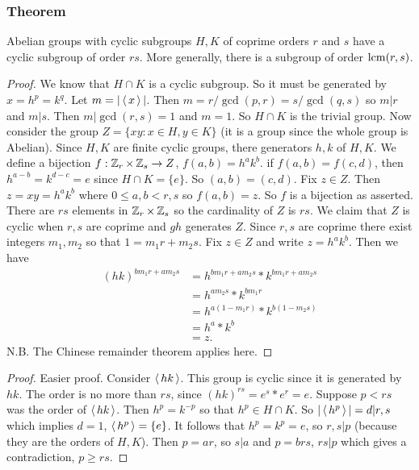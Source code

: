 \subsubsection*{Theorem}
Abelian groups with cyclic subgroups $H,K$ of coprime orders $r$ and $s$
have a cyclic subgroup of order $rs$. More generally, there is a subgroup of order $\operatorname{lcm}(r,s)$.
\begin{proof}
We know that $H \cap K$ is a cyclic subgroup. So it must be generated by $x = h^p  = k^q$.
Let $m = |\operatorname{\langle} x \operatorname{\rangle}|$. Then $m = r \slash \gcd(p,r) = s \slash \gcd(q,s)$
so $m \vert r$ and $m \vert s$. Then $m \vert \gcd(r,s) = 1$ and $m = 1$. So $H \cap K$ is the trivial group. Now consider the group $Z = \{xy:x \in H, y \in K  \}$ (it is a group since the whole group is Abelian).
Since $H,K$ are finite cyclic groups,  there generators $h,k$ of $H,K$.
We define
a bijection $f:\operatorname{\mathbb{Z}}_r \times \operatorname{\mathbb{Z}}_s \to Z$, $f(a,b) = h^a k^b$. if $f(a,b) = f(c,d)$,
then $h^{a-b} = k^{d-c} = e$ since $H \cap K  = \{e\}$. So $(a,b) = (c,d)$. Fix $z \in Z$. Then $z = xy = h^a k^b$ where $0 \leq a,b < r,s$ so $f(a,b) = z$. So $f$ is a bijection as asserted. There are $rs$ elements in $\operatorname{\mathbb{Z}}_r \times \operatorname{\mathbb{Z}}_s$ so the cardinality of $Z$ is $rs$.
We claim that $Z$ is cyclic when $r,s$ are coprime and $gh$ generates $Z$.
Since $r,s$ are coprime there exist integers $m_1,m_2$ so that $1 = m_1 r + m_2s$. Fix $z \in Z$ and write $z = h^ak^b$. Then we have \begin{align*}
(hk)^{bm_1r+am_2s} &= h^{bm_1r+am_2s}*k^{bm_1r+am_2s} \\ &= h^{am_2s}*k^{bm_1r} \\
&= h^{a(1-m_1r)}*k^{b(1-m_2s)} \\
&= h^a*k^b \\ &= z.
\end{align*}
N.B. The Chinese remainder theorem applies here.
\end{proof}
\begin{proof}
Easier proof. Consider $\operatorname{\langle} hk \operatorname{\rangle}$. This group is cyclic since it is generated by $hk$.
The order is no more than $rs$, since $(hk)^{rs} = e^s*e^r = e$. Suppose $p < rs$ was the order of $\operatorname{\langle} hk \operatorname{\rangle}$.
Then $h^p = k^{-p}$ so that $h^p \in H \cap K$. So $|\operatorname{\langle} h^p \operatorname{\rangle}| = d \vert r,s$ which implies $d = 1$, $\operatorname{\langle} h^p \operatorname{\rangle} = \{ e \}$. It follows that $h^p = k^p = e$, so $r,s \vert p$ (because they are the orders of $H,K$).
Then $p = ar$, so $s \vert a$ and $p = brs$, $rs \vert p$ which gives a contradiction, $p \geq rs$.
\end{proof}
